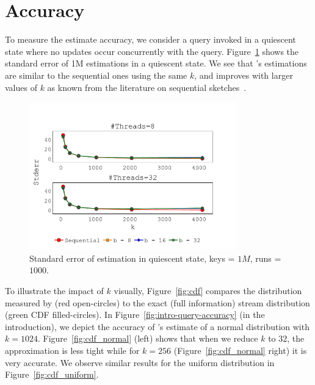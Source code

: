 \section{Accuracy}
\label{sec:accuracy} 
To measure the estimate accuracy, we consider a query invoked in a quiescent state where no updates occur concurrently with the query. Figure~\ref{fig: accuracy_stderr} shows the standard error of 1M estimations in a quiescent state.%
We see that \mysketch's estimations are similar to the sequential ones using the same $k$, and improves with larger values of $k$ as known from the literature on sequential sketches~\cite{mergeables_summaries}.
\begin{figure}[h!]
    \centering
    \includegraphics[width=0.8\textwidth,trim={0 0cm 0cm 1.7cm},clip]
    {graphics/graphs/accuracy/oracle_Quancurrent_block_numa_query_hist_stderr_qs_keys983040_runs1000_k_64_128_256_512_1024_2048_4096_b_8_16_32_T_8_32_11-08-2022_20-26-21.pdf}
    \caption{Standard error of estimation in quiescent state, keys = $1M$, runs = $1000$.}
    \label{fig: accuracy_stderr}
\end{figure}

To illustrate the impact of $k$ visually, Figure~\ref{fig:cdf} compares the distribution measured by \mysketch (red open-circles) to the exact (full information) stream distribution (green CDF filled-circles). In Figure~\ref{fig:intro-query-accuracy} (in the introduction), we depict the accuracy of \mysketch's estimate of a normal distribution with $k=1024$. Figure~\ref{fig:cdf_normal} (left) shows that when we reduce $k$ to $32$, the approximation is less tight while for $k=256$ (Figure~\ref{fig:cdf_normal} right) it is very accurate. We observe similar results for the uniform distribution in Figure~\ref{fig:cdf_uniform}. 

